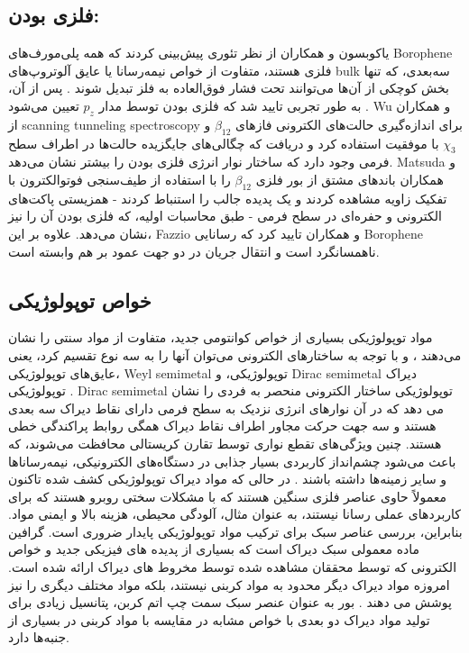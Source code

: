 \subsection{فلزی بودن:}
یاکوبسون و همکاران \cite{penevCanTwoDimensionalBoron2016} از نظر تئوری پیش‌بینی کردند که همه پلی‌مورف‌های \gls{Borophene} فلزی هستند، متفاوت از خواص نیمه‌رسانا یا عایق آلوتروپ‌های \gls{bulk} سه‌بعدی، که تنها بخش کوچکی از آن‌ها می‌توانند تحت فشار فوق‌العاده به فلز تبدیل شوند \cite{eremetsSuperconductivityBoron2001}. پس از آن، به طور تجربی تایید شد که فلزی بودن توسط مدار $p_z$ تعیین می‌شود \cite{shangTwoDimensionalBoron2018}. \gls{Wu} و همکاران \cite{fengExperimentalRealizationTwodimensional2016} از \gls{scanning tunneling spectroscopy} برای اندازه‌گیری حالت‌های الکترونی فازهای $\beta_{12}$ و $\chi_3$ با موفقیت استفاده کرد و دریافت که چگالی‌های جایگزیده حالت‌ها در اطراف سطح فرمی وجود دارد که ساختار نوار انرژی فلزی بودن را بیشتر نشان می‌دهد. \gls{Matsuda} و همکاران \cite{fengDirectEvidenceMetallic2016} باندهای مشتق از بور فلزی $\beta_{12}$ را با استفاده از طیف‌سنجی فوتوالکترون با تفکیک زاویه مشاهده کردند و یک پدیده جالب را استنباط کردند - همزیستی پاکت‌های الکترونی و حفره‌ای در سطح فرمی - طبق محاسبات اولیه، که فلزی بودن آن را نیز نشان می‌دهد. علاوه بر این، \gls{Fazzio} و همکاران \cite{padilhaDirectionalDependenceElectronic2016} تایید کرد که رسانایی \gls{Borophene} ناهمسانگرد است و انتقال جریان در دو جهت عمود بر هم وابسته است.
\subsection{خواص توپولوژیکی}
مواد توپولوژیکی بسیاری از خواص کوانتومی جدید، متفاوت از مواد سنتی را نشان می‌دهند \cite{qiTopologicalInsulatorsSuperconductors2011}، و با توجه به ساختارهای الکترونی می‌توان آنها را به سه نوع تقسیم کرد، یعنی عایق‌های توپولوژیکی، \cite{hsiehTopologicalCrystallineInsulators2013}  \gls{Weyl semimetal} توپولوژیکی، \cite{xuDiscoveryWeylFermion2015} و \gls{Dirac semimetal} دیراک توپولوژیکی \cite{wanTopologicalSemimetalFermiarc2011}. \gls{Dirac semimetal} توپولوژیکی ساختار الکترونی منحصر به فردی را نشان می دهد که در آن نوارهای انرژی نزدیک به سطح فرمی دارای نقاط دیراک سه بعدی هستند و سه جهت حرکت مجاور اطراف نقاط دیراک همگی روابط پراکندگی خطی هستند. چنین ویژگی‌های تقطع نواری توسط تقارن کریستالی محافظت می‌شوند، که باعث می‌شود چشم‌انداز کاربردی بسیار جذابی در دستگاه‌های الکترونیکی، نیمه‌رساناها و سایر زمینه‌ها داشته باشند \cite{zhaoPalgraphynePromising2D2020}. در حالی که مواد دیراک توپولوژیکی کشف شده تاکنون معمولاً حاوی عناصر فلزی سنگین هستند که با مشکلات سختی روبرو هستند که برای کاربردهای عملی رسانا نیستند، به عنوان مثال، آلودگی محیطی، هزینه بالا و ایمنی مواد. بنابراین، بررسی عناصر سبک برای ترکیب مواد توپولوژیکی پایدار ضروری است. گرافین ماده معمولی سبک دیراک است که بسیاری از پدیده های فیزیکی جدید و خواص الکترونی که توسط محققان مشاهده شده توسط مخروط های دیراک ارائه شده است. امروزه مواد دیراک دیگر محدود به مواد کربنی نیستند، بلکه مواد مختلف دیگری را نیز پوشش می دهند \cite{novoselovElectricFieldEffect2004}. بور به عنوان عنصر سبک سمت چپ اتم کربن، پتانسیل زیادی برای تولید مواد دیراک دو بعدی با خواص مشابه در مقایسه با مواد کربنی در بسیاری از جنبه‌ها دارد. 

